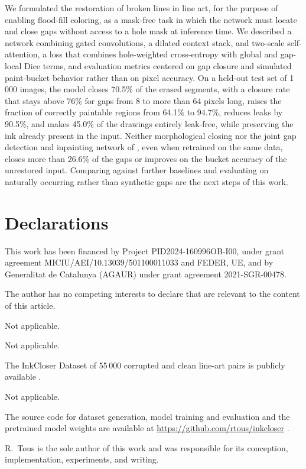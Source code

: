 \documentclass[pdflatex,sn-mathphys-num]{sn-jnl}%
\begin{document}
We formulated the restoration of broken lines in line art, for the purpose
of enabling flood-fill coloring, as a mask-free task in which the network must
locate and close gaps without access to a hole mask at inference time. We
described a network combining gated convolutions, a dilated context stack, and
two-scale self-attention, a loss that combines hole-weighted cross-entropy with
global and gap-local Dice terms, and evaluation metrics centered on gap closure and
simulated paint-bucket behavior rather than on pixel accuracy. On a held-out test set
of 1\,000 images, the model closes 70.5\% of the erased segments, with a closure rate
that stays above 76\% for gaps from 8 to more than 64 pixels long, raises the
fraction of correctly paintable regions from 64.1\% to 94.7\%, reduces leaks by
90.5\%, and makes 45.0\% of the drawings entirely leak-free, while preserving the ink
already present in the input. Neither morphological closing nor the joint gap
detection and inpainting network of \citet{sasaki2017joint}, even when retrained on
the same data, closes more than 26.6\% of the gaps or improves on the bucket accuracy
of the unrestored input. Comparing against further baselines and evaluating on naturally occurring rather than synthetic gaps
are the next steps of this work.

\backmatter

\section*{Declarations}

This work has been financed by Project PID2024-160996OB-I00, under grant agreement
MICIU/AEI/10.13039/501100011033 and FEDER, UE, and by Generalitat de Catalunya (AGAUR)
under grant agreement 2021-SGR-00478.

The author has no competing interests to declare that are relevant to the content of
this article.

Not applicable.

Not applicable.

The InkCloser Dataset of 55\,000 corrupted and clean line-art pairs is publicly
available \citep{datasetInkCloser}.

Not applicable.

The source code for dataset generation, model training and evaluation and the
pretrained model weights are available at \url{https://github.com/rtous/inkcloser}
\citep{codeInkCloser}.

R.~Tous is the sole author of this work and was responsible for its conception,
implementation, experiments, and writing.


\end{document}
